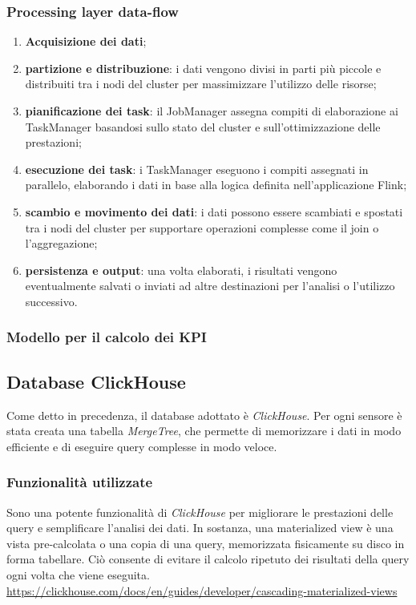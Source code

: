 \subsubsection{Processing layer data-flow}
\begin{enumerate}
	\item \textbf{Acquisizione dei dati};
	\item \textbf{partizione e distribuzione}: i dati vengono divisi in parti più piccole e distribuiti tra i nodi del cluster per massimizzare l'utilizzo delle risorse;
	\item \textbf{pianificazione dei task}: il JobManager assegna compiti di elaborazione ai TaskManager basandosi sullo stato del cluster e sull'ottimizzazione delle prestazioni;
	\item \textbf{esecuzione dei task}: i TaskManager eseguono i compiti assegnati in parallelo, elaborando i dati in base alla logica definita nell'applicazione Flink;
	\item \textbf{scambio e movimento dei dati}: i dati possono essere scambiati e spostati tra i nodi del cluster per supportare operazioni complesse come il join o l'aggregazione;
	\item \textbf{persistenza e output}: una volta elaborati, i risultati vengono eventualmente salvati o inviati ad altre destinazioni per l'analisi o l'utilizzo successivo.
\end{enumerate}
\subsubsection{Modello per il calcolo dei KPI}



\subsection{Database ClickHouse}
Come detto in precedenza, il database adottato è \textit{ClickHouse}. Per ogni sensore è stata creata una tabella \textit{MergeTree}, che permette di memorizzare i dati in modo efficiente e di eseguire query complesse in modo veloce.

\subsubsection{Funzionalità utilizzate}
Sono una potente funzionalità di \textit{ClickHouse} per migliorare le prestazioni delle query e semplificare l'analisi dei dati. In sostanza, una materialized view è una vista pre-calcolata o una copia di una query, memorizzata fisicamente su disco in forma tabellare. Ciò consente di evitare il calcolo ripetuto dei risultati della query ogni volta che viene eseguita.
\url{https://clickhouse.com/docs/en/guides/developer/cascading-materialized-views}

